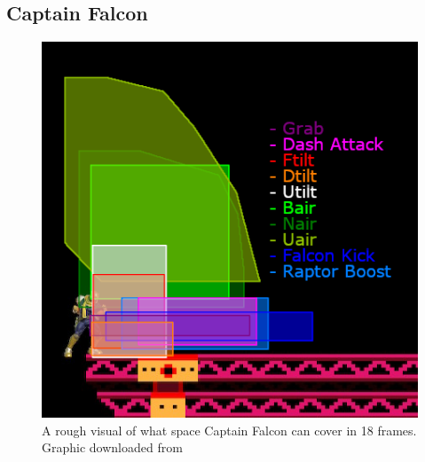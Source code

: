 \subsection{Captain Falcon}

\begin{figure}[h]
    \centering
    \includegraphics[width=.4\textwidth]{images/threat-ranges/falcon}
    \caption{A rough visual of what space Captain Falcon can cover in 18 frames. Graphic downloaded from\cite{ref:zovrah:threat-range:falcon}}
\end{figure}

